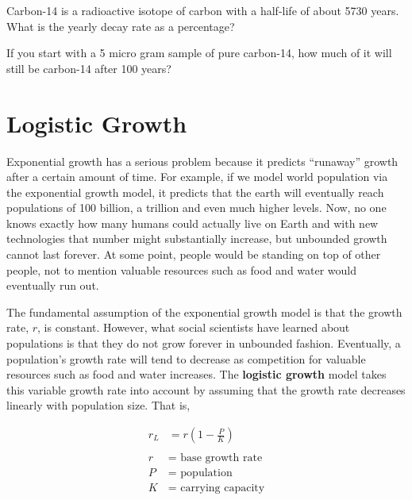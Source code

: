 \newpage

\begin{exercise}
  Carbon-14 is a radioactive isotope of carbon with a half-life of
  about 5730 years. What is the yearly decay rate as a percentage?

\end{exercise}

\begin{exercise}
  If you start with a 5 micro gram sample of pure carbon-14, how much
  of it will still be carbon-14 after 100 years?

\end{exercise}

\newpage

\section{Logistic Growth}%
\label{sec:logistic-growth}

Exponential growth has a serious problem because it predicts
``runaway'' growth after a certain amount of time. For example, if we
model world population via the exponential growth model, it predicts
that the earth will eventually reach populations of 100 billion, a
trillion and even much higher levels. Now, no one knows exactly how
many humans could actually live on Earth and with new technologies
that number might substantially increase, but unbounded growth cannot
last forever. At some point, people would be standing on top of other
people, not to mention valuable resources such as food and water would
eventually run out.

The fundamental assumption of the exponential growth model is that the
growth rate, \(r\), is constant. However, what social scientists have
learned about populations is that they do not grow forever in
unbounded fashion. Eventually, a population's growth rate will tend to
decrease as competition for valuable resources such as food and water
increases. The \textbf{logistic growth} model takes this variable
growth rate into account by assuming that the growth rate decreases
linearly with population size. That is,

\begin{align*}
  \label{eq:logistic-growth-rate}
  r_{L} &= r \left( 1 - \frac{P}{K} \right) \\ \\
  r &= \text{ base growth rate} \\
  P &= \text{ population} \\
  K &= \text{ carrying capacity}
\end{align*}

